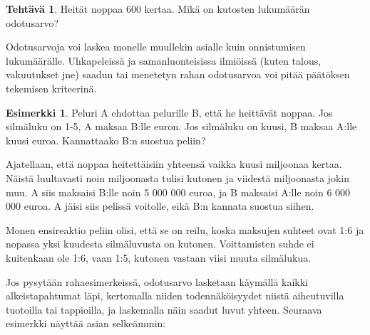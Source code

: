 \documentclass[12pt,leqno,a4paper,oneside]{amsart}
\theoremstyle{definition}
\newtheorem{example}[proclaim]{Esimerkki}
\newtheorem{exercise}{Tehtävä}
\theoremstyle{remark}
\numberwithin{equation}{section}
\begin{document}
\begin{center}
\end{center}


\begin{exercise}
 Heität noppaa 600 kertaa. Mikä on kutosten lukumäärän odotusarvo?
\end{exercise}

Odotusarvoja voi laskea monelle muullekin asialle kuin onnistumisen lukumäärälle. Uhkapeleissä ja samanluonteisissa ilmiöissä (kuten talous, vakuutukset
jne) saadun tai menetetyn rahan odotusarvoa voi pitää päätöksen tekemisen kriteerinä.

\begin{example}
 Peluri A ehdottaa pelurille B, että he heittävät noppaa. Jos silmäluku on 1-5, A maksaa B:lle euron. Jos silmäluku on kuusi, B maksaa A:lle kuusi euroa.
 Kannattaako B:n suostua peliin?
 
 Ajatellaan, että noppaa heitettäisiin yhteensä vaikka kuusi miljoonaa kertaa. Näistä luultavasti noin miljoonasta tulisi kutonen ja viidestä miljoonasta
 jokin muu. A siis maksaisi B:lle noin 5 000 000 euroa, ja B maksaisi A:lle noin 6 000 000 euroa. A jäisi siis pelissä voitolle, eikä B:n kannata
 suostua siihen. 
 
 Monen ensireaktio peliin olisi, että se on reilu, koska maksujen suhteet ovat 1:6 ja nopassa yksi kuudesta silmäluvusta on kutonen. Voittamisten
 suhde ei kuitenkaan ole 1:6, vaan 1:5, kutonen vastaan viisi muuta silmälukua.
\end{example}

Jos pysytään rahaesimerkeissä, odotusarvo lasketaan käymällä kaikki alkeistapahtumat läpi, kertomalla niiden todennäköisyydet niistä aiheutuvilla tuotoilla
tai tappioilla, ja laskemalla näin saadut luvut yhteen. Seuraava esimerkki näyttää asian selkeämmin:
\end{document}
